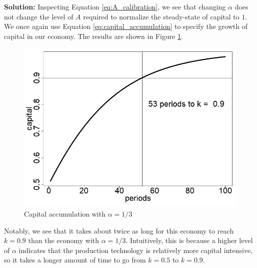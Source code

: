 \documentclass[10pt,letter]{article}
\begin{document}
	\noindent\textbf{Solution:} Inspecting Equation \ref{eq:A_calibration}, we see that changing $\alpha$ does not change the level of $A$ required to normalize the steady-state of capital to $1$. We once again use Equation \ref{eq:capital_accumulation} to specify the growth of capital in our economy. The results are shown in Figure \ref{fig:cap_accumulation_alpha_high}.
	\begin{figure}[!htb]
		\centering
		\includegraphics[width=0.5\linewidth]{solow_growth_alpha_high.png}
		\caption{Capital accumulation with $\alpha = 1/3$}
		\label{fig:cap_accumulation_alpha_high}
	\end{figure} 
	Notably, we see that it takes about twice as long for this economy to reach $k=0.9$ than the economy with $\alpha = 1/3$. Intuitively, this is because a higher level of $\alpha$ indicates that the production technology is relatively more capital intensive, so it takes a longer amount of time to go from $k=0.5$ to $k=0.9$. 





%
\end{document}
